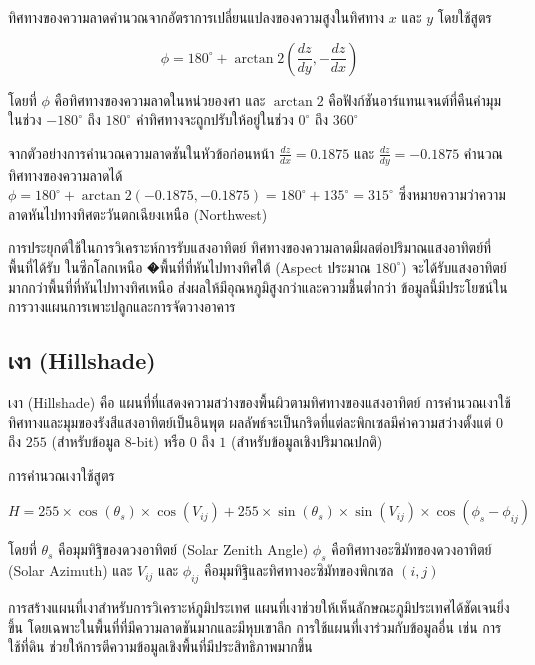 ทิศทางของความลาดคำนวณจากอัตราการเปลี่ยนแปลงของความสูงในทิศทาง $x$ และ $y$ โดยใช้สูตร

\[
\phi = 180^\circ + \arctan 2\left( \frac{dz}{dy}, -\frac{dz}{dx} \right)
\]

โดยที่ $\phi$ คือทิศทางของความลาดในหน่วยองศา และ $\arctan 2$ คือฟังก์ชันอาร์แทนเจนต์ที่คืนค่ามุมในช่วง $-180^\circ$ ถึง $180^\circ$ ค่าทิศทางจะถูกปรับให้อยู่ในช่วง $0^\circ$ ถึง $360^\circ$

\begin{ex}
จากตัวอย่างการคำนวณความลาดชันในหัวข้อก่อนหน้า $\frac{dz}{dx} = 0.1875$ และ $\frac{dz}{dy} = -0.1875$ คำนวณทิศทางของความลาดได้ $\phi = 180^\circ + \arctan 2(-0.1875, -0.1875) = 180^\circ + 135^\circ = 315^\circ$ ซึ่งหมายความว่าความลาดหันไปทางทิศตะวันตกเฉียงเหนือ (Northwest)
\end{ex}

\begin{ex}
การประยุกต์ใช้ในการวิเคราะห์การรับแสงอาทิตย์ ทิศทางของความลาดมีผลต่อปริมาณแสงอาทิตย์ที่พื้นที่ได้รับ ในซีกโลกเหนือ �พื้นที่ที่หันไปทางทิศใต้ (Aspect ประมาณ $180^\circ$) จะได้รับแสงอาทิตย์มากกว่าพื้นที่ที่หันไปทางทิศเหนือ ส่งผลให้มีอุณหภูมิสูงกว่าและความชื้นต่ำกว่า ข้อมูลนี้มีประโยชน์ในการวางแผนการเพาะปลูกและการจัดวางอาคาร
\end{ex}

\subsection{เงา (Hillshade)}

เงา (Hillshade) คือ แผนที่ที่แสดงความสว่างของพื้นผิวตามทิศทางของแสงอาทิตย์ การคำนวณเงาใช้ทิศทางและมุมของรังสีแสงอาทิตย์เป็นอินพุต ผลลัพธ์จะเป็นกริดที่แต่ละพิกเซลมีค่าความสว่างตั้งแต่ $0$ ถึง $255$ (สำหรับข้อมูล 8-bit) หรือ $0$ ถึง $1$ (สำหรับข้อมูลเชิงปริมาณปกติ)

การคำนวณเงาใช้สูตร

\[
H = 255 \times \cos(\theta_s) \times \cos(V_{ij}) + 255 \times \sin(\theta_s) \times \sin(V_{ij}) \times \cos(\phi_s - \phi_{ij})
\]

โดยที่ $\theta_s$ คือมุมทิฐิของดวงอาทิตย์ (Solar Zenith Angle) $\phi_s$ คือทิศทางอะซิมัทของดวงอาทิตย์ (Solar Azimuth) และ $V_{ij}$ และ $\phi_{ij}$ คือมุมทิฐิและทิศทางอะซิมัทของพิกเซล $(i,j)$

\begin{ex}
การสร้างแผนที่เงาสำหรับการวิเคราะห์ภูมิประเทศ แผนที่เงาช่วยให้เห็นลักษณะภูมิประเทศได้ชัดเจนยิ่งขึ้น โดยเฉพาะในพื้นที่ที่มีความลาดชันมากและมีหุบเขาลึก การใช้แผนที่เงาร่วมกับข้อมูลอื่น เช่น การใช้ที่ดิน ช่วยให้การตีความข้อมูลเชิงพื้นที่มีประสิทธิภาพมากขึ้น
\end{ex}

